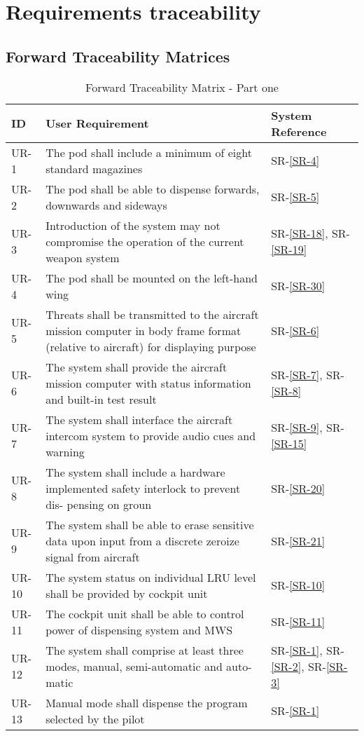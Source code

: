 \documentclass[Main]{subfiles}
\begin{document}
\chapter{Requirements traceability}
\section{Forward Traceability Matrices}
\begin{table}[htbp]
	\centering
	\begin{tabular}{l p{10cm} l} \hline
	ID & User Requirement & System Reference \\\hline
	UR-1 & The pod shall include a minimum of eight standard magazines & SR-\ref{SR-4} \\
	UR-2 & The pod shall be able to dispense forwards, downwards and sideways & SR-\ref{SR-5} \\
	UR-3 & Introduction of the system may not compromise the operation of the current weapon
	system & SR-\ref{SR-18}, SR-\ref{SR-19} \\
	UR-4 & The pod shall be mounted on the left-hand wing & SR-\ref{SR-30} \\
	UR-5 & Threats shall be transmitted to the aircraft mission computer in body frame format
	(relative to aircraft) for displaying purpose & SR-\ref{SR-6} \\
	UR-6 & The system shall provide the aircraft mission computer with status information and
	built-in test result & SR-\ref{SR-7}, SR-\ref{SR-8} \\
	UR-7 & The system shall interface the aircraft intercom system to provide audio cues and
	warning & SR-\ref{SR-9}, SR-\ref{SR-15} \\
	UR-8 & The system shall include a hardware implemented safety interlock to prevent dis-
	pensing on groun & SR-\ref{SR-20} \\
	UR-9 & The system shall be able to erase sensitive data upon input from a discrete zeroize
	signal from aircraft & SR-\ref{SR-21} \\
	UR-10 & The system status on individual LRU level shall be provided by cockpit unit & SR-\ref{SR-10} \\
	UR-11 & The cockpit unit shall be able to control power of dispensing system and MWS & SR-\ref{SR-11} \\
	UR-12 & The system shall comprise at least three modes, manual, semi-automatic and auto-
	matic & SR-\ref{SR-1}, SR-\ref{SR-2}, SR-\ref{SR-3} \\
	UR-13 & Manual mode shall dispense the program selected by the pilot & SR-\ref{SR-1} \\\hline
	\end{tabular}
\caption{Forward Traceability Matrix - Part one}
\label{Tab:ForwardPartOne}
\end{table}
\end{document}

